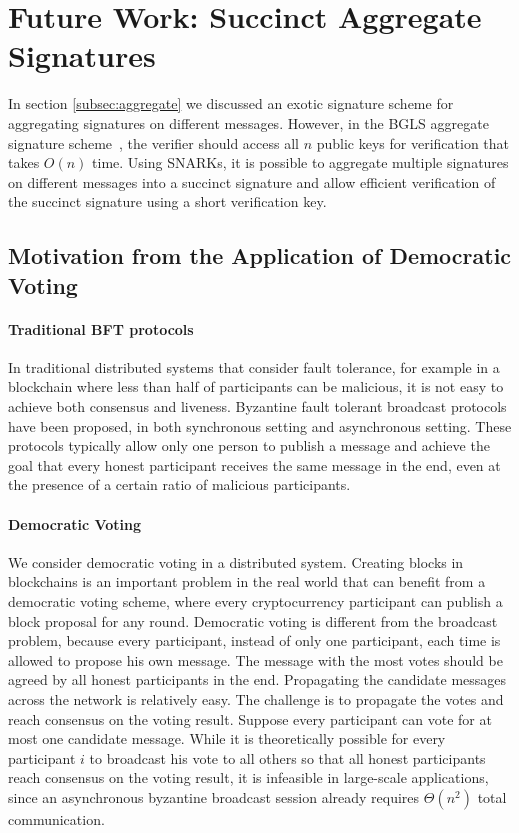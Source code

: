 \section{Future Work: Succinct Aggregate Signatures} \label{sec:future-aggregate}

In section \ref{subsec:aggregate} we discussed an exotic signature scheme for aggregating signatures on different messages. However, in the BGLS aggregate signature scheme~\cite{DBLP:conf/eurocrypt/BonehGLS03}, the verifier should access all $n$ public keys for verification that takes $O(n)$ time. Using SNARKs, it is possible to aggregate multiple signatures on different messages into a succinct signature and allow efficient verification of the succinct signature using a short verification key. 

\subsection{Motivation from the Application of Democratic Voting} 

\paragraph{Traditional BFT protocols} In traditional distributed systems that consider fault tolerance, for example in a blockchain where less than half of participants can be malicious, it is not easy to achieve both consensus and liveness. Byzantine fault tolerant broadcast protocols have been proposed, in both synchronous setting and asynchronous setting. These protocols typically allow only one person to publish a message and achieve the goal that every honest participant receives the same message in the end, even at the presence of a certain ratio of malicious participants. 

\paragraph{Democratic Voting} We consider democratic voting in a distributed system. Creating blocks in blockchains is an important problem in the real world that can benefit from a democratic voting scheme,  where every cryptocurrency participant can publish a block proposal for any round. Democratic voting is different from the broadcast problem, because every participant, instead of only one participant, each time is allowed to propose his own message. The message with the most votes should be agreed by all honest participants in the end. Propagating the candidate messages across the network is relatively easy. The challenge is to propagate the votes and reach consensus on the voting result. Suppose every participant can vote for at most one candidate message. While it is theoretically possible for every participant $i$ to broadcast his vote to all others so that all honest participants reach consensus on the voting result, it is infeasible in large-scale applications, since an asynchronous byzantine broadcast session already requires $\Theta(n^2)$ total communication. 


